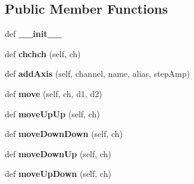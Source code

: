 \subsection*{Public Member Functions}
\begin{DoxyCompactItemize}
\item 
\hypertarget{classpyagilis_1_1controller_1_1_a_g_u_c8_a9bc6969227da436d24fca3081860f438}{}def {\bfseries \+\_\+\+\_\+init\+\_\+\+\_\+}\label{classpyagilis_1_1controller_1_1_a_g_u_c8_a9bc6969227da436d24fca3081860f438}

\item 
\hypertarget{classpyagilis_1_1controller_1_1_a_g_u_c8_a4c7e1b52f93d89332d80da5ca8bde688}{}def {\bfseries chchch} (self, ch)\label{classpyagilis_1_1controller_1_1_a_g_u_c8_a4c7e1b52f93d89332d80da5ca8bde688}

\item 
\hypertarget{classpyagilis_1_1controller_1_1_a_g_u_c8_aec0759230e82111cb87e9a74708d2520}{}def {\bfseries add\+Axis} (self, channel, name, alias, step\+Amp)\label{classpyagilis_1_1controller_1_1_a_g_u_c8_aec0759230e82111cb87e9a74708d2520}

\item 
\hypertarget{classpyagilis_1_1controller_1_1_a_g_u_c8_ade6d12edb331d328af5eac095b46a0ae}{}def {\bfseries move} (self, ch, d1, d2)\label{classpyagilis_1_1controller_1_1_a_g_u_c8_ade6d12edb331d328af5eac095b46a0ae}

\item 
\hypertarget{classpyagilis_1_1controller_1_1_a_g_u_c8_a88bc6a3a60de40486b69867d0c596472}{}def {\bfseries move\+Up\+Up} (self, ch)\label{classpyagilis_1_1controller_1_1_a_g_u_c8_a88bc6a3a60de40486b69867d0c596472}

\item 
\hypertarget{classpyagilis_1_1controller_1_1_a_g_u_c8_ae8f4fada82520979b46d8a862e759707}{}def {\bfseries move\+Down\+Down} (self, ch)\label{classpyagilis_1_1controller_1_1_a_g_u_c8_ae8f4fada82520979b46d8a862e759707}

\item 
\hypertarget{classpyagilis_1_1controller_1_1_a_g_u_c8_a3d00f6a96a740cd7181281c07c2b1ccf}{}def {\bfseries move\+Down\+Up} (self, ch)\label{classpyagilis_1_1controller_1_1_a_g_u_c8_a3d00f6a96a740cd7181281c07c2b1ccf}

\item 
\hypertarget{classpyagilis_1_1controller_1_1_a_g_u_c8_acde9b9adfded39a6f28e1b8a48a58e84}{}def {\bfseries move\+Up\+Down} (self, ch)\label{classpyagilis_1_1controller_1_1_a_g_u_c8_acde9b9adfded39a6f28e1b8a48a58e84}


\end{DoxyCompactItemize}
